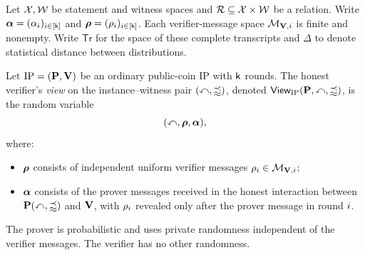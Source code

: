 Let \(\mathcal X,\mathcal W\) be statement and witness spaces and \(\mathcal{R}\subseteq\mathcal X\times\mathcal W\) be a relation. Write \(\boldsymbol{\alpha}=(\alpha_{i})_{i\in[\mathsf{k}]}\) and \(\boldsymbol{\rho}=(\rho_{i})_{i\in[\mathsf{k}]}\). Each verifier-message space \(\mathcal M_{\mathbf{V},i}\) is finite and nonempty. Write \(\mathsf{Tr}\) for the space of these complete transcripts and \(\Delta\) to denote statistical distance between distributions.

\begin{definition}
\label{def:ip_verifier_view}
Let \(\mathrm{IP}=(\mathbf{P},\mathbf{V})\) be an ordinary public-coin IP with \(\mathsf{k}\) rounds. The honest verifier's \emph{view} on the instance--witness pair \((\mathbb{x},\mathbb{w})\), denoted \(\mathsf{View}_{\mathrm{IP}}(\mathbf{P},\mathbb{x},\mathbb{w})\), is the random variable
\begin{equation*}
  (\mathbb{x},\boldsymbol{\rho},\boldsymbol{\alpha}),
\end{equation*}
where:
\begin{itemize}
  \item \(\boldsymbol{\rho}\) consists of independent uniform verifier messages \(\rho_{i}\in\mathcal M_{\mathbf{V},i}\);
  \item \(\boldsymbol{\alpha}\) consists of the prover messages received in the honest interaction between \(\mathbf{P}(\mathbb{x},\mathbb{w})\) and \(\mathbf{V}\), with \(\rho_{i}\) revealed only after the prover message in round \(i\).
\end{itemize}
The prover is probabilistic and uses private randomness independent of the verifier messages. The verifier has no other randomness.
\leanok
\end{definition}

